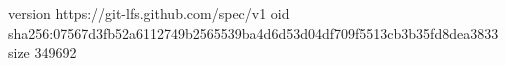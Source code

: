 version https://git-lfs.github.com/spec/v1
oid sha256:07567d3fb52a6112749b2565539ba4d6d53d04df709f5513cb3b35fd8dea3833
size 349692
